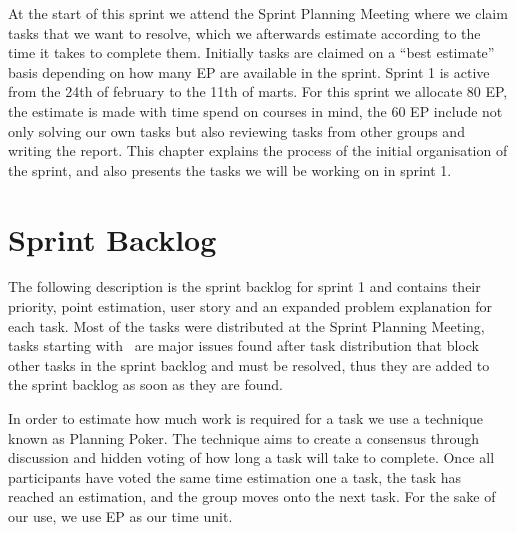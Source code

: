At the start of this sprint we attend the Sprint Planning Meeting where we claim tasks that we want to resolve, which we afterwards estimate according to the time it takes to complete them.
Initially tasks are claimed on a ``best estimate'' basis depending on how many EP are available in the sprint.
Sprint 1 is active from the 24th of february to the 11th of marts. 
For this sprint we allocate 80 EP, the estimate is made with time spend on courses in mind, the 60 EP include not only solving our own tasks but also reviewing tasks from other groups and writing the report.
This chapter explains the process of the initial organisation of the sprint, and also presents the tasks we will be working on in sprint 1.

\section{Sprint Backlog}\label{plan1}
The following description is the sprint backlog for sprint 1 and contains their priority, point estimation, user story and an expanded problem explanation for each task.
Most of the tasks were distributed at the Sprint Planning Meeting, tasks starting with \pblocking~are major issues found after task distribution that block other tasks in the sprint backlog and must be resolved, thus they are added to the sprint backlog as soon as they are found.

In order to estimate how much work is required for a task we use a technique known as Planning Poker.
The technique aims to create a consensus through discussion and hidden voting of how long a task will take to complete.
Once all participants have voted the same time estimation one a task, the task has reached an estimation, and the group moves onto the next task.
For the sake of our use, we use EP as our time unit.

